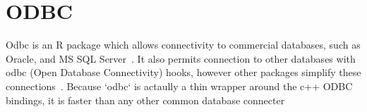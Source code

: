 \section{ODBC}

Odbc is an R package which allows connectivity to commercial databases, such as
Oracle, and MS SQL Server~\cite{hid-sp18-403-R-odbc}. It also permits
connection to other databases with odbc (Open Database Connectivity) hooks,
however other packages simplify these connections~\cite{hid-sp18-403-R-dbi}.
Because `odbc` is actaully a thin wrapper around the c++ ODBC bindings, it is
faster than any other common database connecter~\cite{rstudio-odbc}
